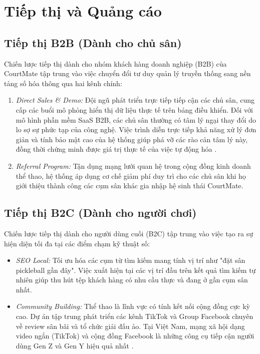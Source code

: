 \section{Tiếp thị và Quảng cáo}

\subsection{Tiếp thị B2B (Dành cho chủ sân)}
Chiến lược tiếp thị dành cho nhóm khách hàng doanh nghiệp (B2B) của CourtMate tập trung vào việc chuyển đổi tư duy quản lý truyền thống sang nền tảng số hóa thông qua hai kênh chính:
\begin{enumerate}
    \item \textit{Direct Sales \& Demo:} Đội ngũ phát triển trực tiếp tiếp cận các chủ sân, cung cấp các buổi mô phỏng hiển thị dữ liệu thực tế trên bảng điều khiển. Đối với mô hình phần mềm SaaS B2B, các chủ sân thường có tâm lý ngại thay đổi do lo sợ sự phức tạp của công nghệ. Việc trình diễn trực tiếp khả năng xử lý đơn giản và tính bảo mật cao của hệ thống giúp phá vỡ các rào cản tâm lý này, đồng thời chứng minh được giá trị thực tế của việc tự động hóa \cite{ref:gartner}.
    \item \textit{Referral Program:} Tận dụng mạng lưới quan hệ trong cộng đồng kinh doanh thể thao, hệ thống áp dụng cơ chế giảm phí duy trì cho các chủ sân khi họ giới thiệu thành công các cụm sân khác gia nhập hệ sinh thái CourtMate. 
\end{enumerate}

\subsection{Tiếp thị B2C (Dành cho người chơi)}
Chiến lược tiếp thị dành cho người dùng cuối (B2C) tập trung vào việc tạo ra sự hiện diện tối đa tại các điểm chạm kỹ thuật số:
\begin{itemize}
    \item \textit{SEO Local:} Tối ưu hóa các cụm từ tìm kiếm mang tính vị trí như "đặt sân pickleball gần đây". Việc xuất hiện tại các vị trí đầu trên kết quả tìm kiếm tự nhiên giúp thu hút tệp khách hàng có nhu cầu thực và đang ở gần cụm sân nhất.
    \item \textit{Community Building:} Thể thao là lĩnh vực có tính kết nối cộng đồng cực kỳ cao. Dự án tập trung phát triển các kênh TikTok và Group Facebook chuyên về review sân bãi và tổ chức giải đấu ảo. Tại Việt Nam, mạng xã hội dạng video ngắn (TikTok) và cộng đồng Facebook là những công cụ tiếp cận người dùng Gen Z và Gen Y hiệu quả nhất \cite{ref:wearesocial}.
\end{itemize}

